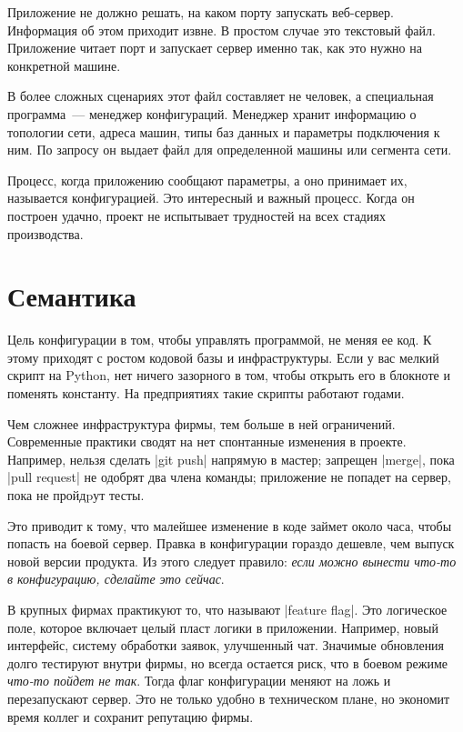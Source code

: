 Приложение не должно решать, на каком порту запускать веб-сервер. Информация об
этом приходит извне. В простом случае это текстовый файл. Приложение читает порт
и запускает сервер именно так, как это нужно на конкретной машине.

В более сложных сценариях этот файл составляет не человек, а специальная
программа~--- менеджер конфигураций. Менеджер хранит информацию о топологии
сети, адреса машин, типы баз данных и параметры подключения к ним. По запросу он
выдает файл для определенной машины или сегмента сети.

Процесс, когда приложению сообщают параметры, а оно принимает их, называется
конфигурацией. Это интересный и важный процесс. Когда он построен удачно, проект
не испытывает трудностей на всех стадиях производства.

\section{Семантика}

Цель конфигурации в том, чтобы управлять программой, не меняя ее код. К этому
приходят с ростом кодовой базы и инфраструктуры. Если у вас мелкий скрипт на
Python, нет ничего зазорного в том, чтобы открыть его в блокноте и поменять
константу. На предприятиях такие скрипты работают годами.

Чем сложнее инфраструктура фирмы, тем больше в ней ограничений. Современные
практики сводят на нет спонтанные изменения в проекте. Например, нельзя сделать
\spverb|git push| напрямую в мастер; запрещен \spverb|merge|, пока \spverb|pull request|
не одобрят два члена команды; приложение не попадет на сервер, пока не
пройдpут тесты.

Это приводит к тому, что малейшее изменение в коде займет около часа, чтобы
попасть на боевой сервер. Правка в конфигурации гораздо дешевле, чем выпуск
новой версии продукта. Из этого следует правило: \emph{если можно вынести что-то
  в конфигурацию, сделайте это сейчас}.

В крупных фирмах практикуют то, что называют \spverb|feature flag|. Это
логическое поле, которое включает целый пласт логики в приложении. Например,
новый интерфейс, систему обработки заявок, улучшенный чат. Значимые обновления
долго тестируют внутри фирмы, но всегда остается риск, что в боевом режиме
\emph{что-то пойдет не так}. Тогда флаг конфигурации меняют на ложь и
перезапускают сервер. Это не только удобно в техническом плане, но экономит
время коллег и сохранит репутацию фирмы.

